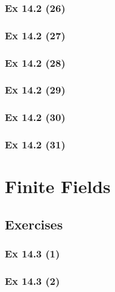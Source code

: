 \subsubsection{Ex 14.2 (26)}\label{sec:Ex_14.2.26}

\subsubsection{Ex 14.2 (27)}\label{sec:Ex_14.2.27}

\subsubsection{Ex 14.2 (28)}\label{sec:Ex_14.2.28}

\subsubsection{Ex 14.2 (29)}\label{sec:Ex_14.2.29}

\subsubsection{Ex 14.2 (30)}\label{sec:Ex_14.2.30}

\subsubsection{Ex 14.2 (31)}\label{sec:Ex_14.2.31}

\newpage		%

\section{Finite Fields}\label{sec:14.3}	
\subsection*{Exercises}\label{sec:14.3_Exercises}

\subsubsection{Ex 14.3 (1)}\label{sec:Ex_14.3.1}

\subsubsection{Ex 14.3 (2)}\label{sec:Ex_14.3.2}

